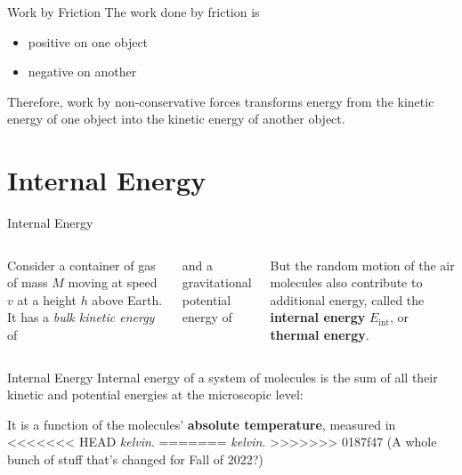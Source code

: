 \documentclass[12pt,compress,aspectratio=169]{beamer}
\begin{document}
\begin{frame}{Work by Friction}
  The work done by friction is
  \begin{itemize}
  \item positive on one object
  \item negative on another
  \end{itemize}
  Therefore, work by non-conservative forces transforms energy from the kinetic
  energy of one object into the kinetic energy of another object.
\end{frame}




\section{Internal Energy}

\begin{frame}{Internal Energy}
  \begin{columns}

    Consider a container of gas of mass $M$ moving at speed $v$ at a height $h$
    above Earth. It has a \emph{bulk kinetic energy} of

    
    and a gravitational potential energy of


    But the random motion of the air molecules also contribute to additional
    energy, called the \textbf{internal energy} $E_\text{int}$, or
    \textbf{thermal energy}.
  \end{columns}
\end{frame}



\begin{frame}{Internal Energy}
  Internal energy of a system of molecules is the sum of all their kinetic and
  potential energies at the microscopic level:


  It is a function of the molecules' \textbf{absolute temperature}, measured in
<<<<<<< HEAD
  \emph{kelvin}.
=======
  \emph{kelvin}. %
>>>>>>> 0187f47 (A whole bunch of stuff that's changed for Fall of 2022?)
\end{frame}
\end{document}
